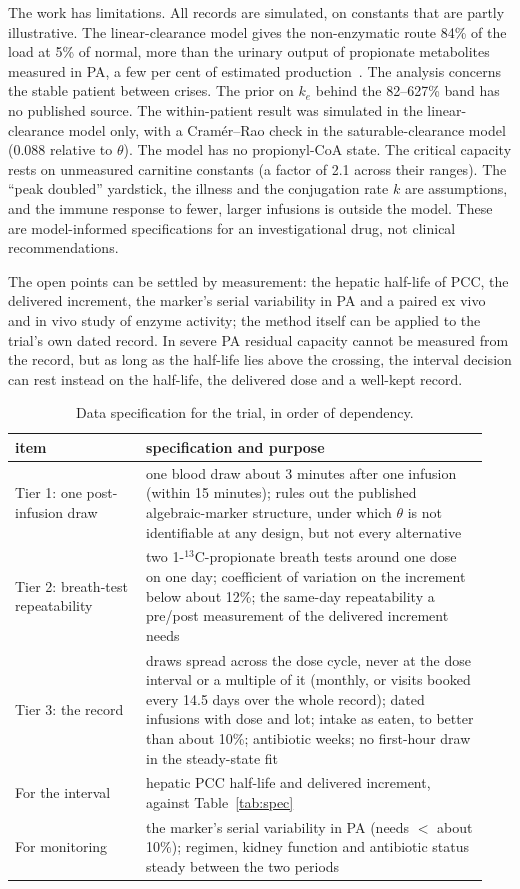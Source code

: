 \documentclass[11pt]{article}
\begin{document}
The work has limitations. All records are simulated, on constants that are partly illustrative.
The linear-clearance model gives the non-enzymatic route 84\% of the load at 5\% of normal, more
than the urinary output of propionate metabolites measured in PA, a few per cent of estimated
production~\cite{thompson1990fasting}. The analysis concerns the stable patient between crises.
The prior on $k_e$ behind the 82--627\% band has no published source. The within-patient result was simulated in the linear-clearance model only, with a
Cram\'er--Rao check in the saturable-clearance model (0.088 relative to $\theta$). The model has no propionyl-CoA state. The critical
capacity rests on unmeasured carnitine constants (a factor of 2.1 across their ranges). The ``peak
doubled'' yardstick, the illness and the conjugation rate $k$ are assumptions, and the immune
response to fewer, larger infusions is outside the model. These are model-informed specifications
for an investigational drug, not clinical recommendations.

The open points can be settled by measurement: the hepatic half-life of PCC, the delivered
increment, the marker's serial variability in PA and a paired ex vivo and in vivo study of enzyme
activity; the method itself can be applied to the trial's own dated record. In severe PA residual
capacity cannot be measured from the record, but as long as the half-life lies above the
crossing, the interval decision can rest instead on the half-life, the delivered dose and a
well-kept record.

\begin{table}[tbp]
\centering\small
\caption{\label{tab:data}Data specification for the trial, in order of dependency.}
\begin{tabular}{@{}p{0.26\linewidth}p{0.68\linewidth}@{}}
\toprule
item & specification and purpose \\
\midrule
Tier 1: one post-infusion draw & one blood draw about 3 minutes after one infusion (within 15
minutes); rules out the published algebraic-marker structure, under which $\theta$ is not
identifiable at any design, but not every alternative \\
Tier 2: breath-test repeatability & two 1-$^{13}$C-propionate breath tests around one dose on
one day; coefficient of variation on the increment below about 12\%; the same-day
repeatability a pre/post measurement of the delivered increment needs \\
Tier 3: the record & draws spread across the dose cycle, never at the dose interval or a
multiple of it (monthly, or visits booked every 14.5 days over the whole record); dated infusions
with dose and lot; intake as eaten, to better than about 10\%; antibiotic weeks; no first-hour
draw in the steady-state fit \\
For the interval & hepatic PCC half-life and delivered increment, against Table~\ref{tab:spec} \\
For monitoring & the marker's serial variability in PA (needs $<$ about 10\%);
regimen, kidney function and antibiotic status steady between the two periods \\
\bottomrule
\end{tabular}
\end{table}
\end{document}
